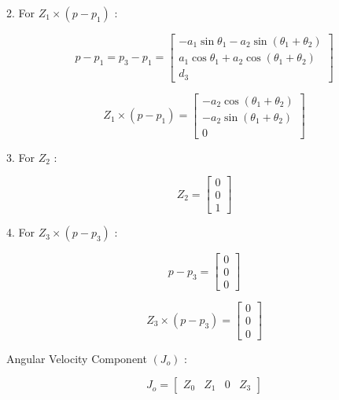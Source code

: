 \documentclass[12pt]{report}
\begin{document}
2. For $Z_1 \times\left(p-p_1\right)$ :

\begin{equation}
	p - p_1 = p_3 - p_1 =
	\begin{bmatrix}
		-a_1 \sin \theta_1 - a_2 \sin (\theta_1 + \theta_2) \\
		a_1 \cos \theta_1 + a_2 \cos (\theta_1 + \theta_2) \\
		d_3
	\end{bmatrix}
\end{equation}

\begin{equation}
	Z_1 \times (p - p_1) =
	\begin{bmatrix}
		-a_2 \cos (\theta_1 + \theta_2) \\
		-a_2 \sin (\theta_1 + \theta_2) \\
		0
	\end{bmatrix}
\end{equation}


3. For $Z_2$ :

\begin{equation}
	Z_2 =
	\begin{bmatrix}
		0 \\
		0 \\
		1
	\end{bmatrix}
\end{equation}


4. For $Z_3 \times\left(p-p_3\right)$ :

\begin{equation}
	p - p_3 =
	\begin{bmatrix}
		0 \\
		0 \\
		0
	\end{bmatrix}
\end{equation}

\begin{equation}
	Z_3 \times (p - p_3) =
	\begin{bmatrix}
		0 \\
		0 \\
		0
	\end{bmatrix}
\end{equation}

Angular Velocity Component $\left(J_o\right)$ :

\begin{equation}
	J_o = 
	\begin{bmatrix}
		Z_0 & Z_1 & 0 & Z_3
	\end{bmatrix}
\end{equation}
\end{document}
